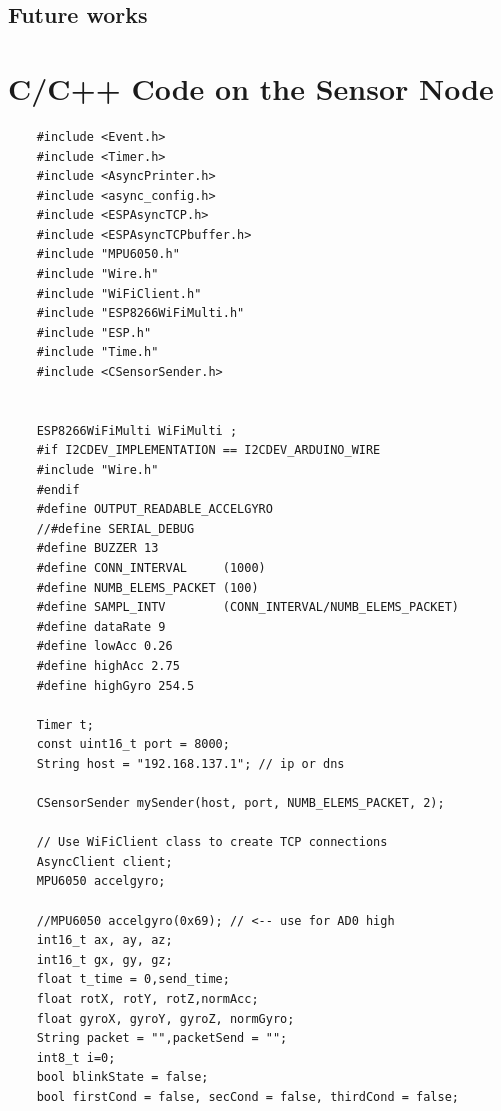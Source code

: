\documentclass[letterpaper,12pt,titlepage,oneside,final]{book}
\begin{document}
\section{Future works}


\appendix
\chapter{C/C++ Code on the Sensor Node}
\begin{lstlisting}
	#include <Event.h>
	#include <Timer.h>
	#include <AsyncPrinter.h>
	#include <async_config.h>
	#include <ESPAsyncTCP.h>
	#include <ESPAsyncTCPbuffer.h>
	#include "MPU6050.h"
	#include "Wire.h"
	#include "WiFiClient.h"
	#include "ESP8266WiFiMulti.h"
	#include "ESP.h"
	#include "Time.h"
	#include <CSensorSender.h>
	
	
	ESP8266WiFiMulti WiFiMulti ;
	#if I2CDEV_IMPLEMENTATION == I2CDEV_ARDUINO_WIRE
	#include "Wire.h"
	#endif
	#define OUTPUT_READABLE_ACCELGYRO
	//#define SERIAL_DEBUG
	#define BUZZER 13
	#define CONN_INTERVAL     (1000)
	#define NUMB_ELEMS_PACKET (100)
	#define SAMPL_INTV        (CONN_INTERVAL/NUMB_ELEMS_PACKET)
	#define dataRate 9
	#define lowAcc 0.26
	#define highAcc 2.75
	#define highGyro 254.5
	
	Timer t;
	const uint16_t port = 8000;
	String host = "192.168.137.1"; // ip or dns
	
	CSensorSender mySender(host, port, NUMB_ELEMS_PACKET, 2);
	
	// Use WiFiClient class to create TCP connections
	AsyncClient client;   
	MPU6050 accelgyro;
	
	//MPU6050 accelgyro(0x69); // <-- use for AD0 high
	int16_t ax, ay, az;
	int16_t gx, gy, gz;
	float t_time = 0,send_time;
	float rotX, rotY, rotZ,normAcc;
	float gyroX, gyroY, gyroZ, normGyro;
	String packet = "",packetSend = "";
	int8_t i=0;
	bool blinkState = false;
	bool firstCond = false, secCond = false, thirdCond = false;
	

\end{lstlisting}
\end{document}
